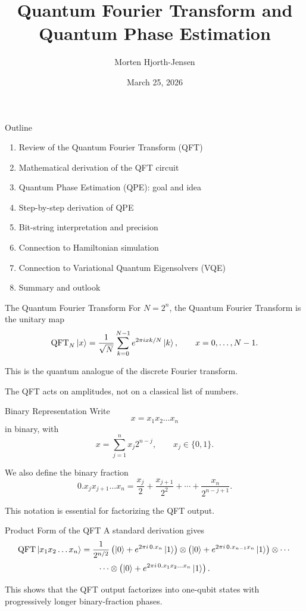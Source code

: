 \documentclass{beamer}
\title{Quantum Fourier Transform and Quantum Phase Estimation}
\author{Morten Hjorth-Jensen}
\date{March 25, 2026}
\begin{document}
\frame{\titlepage}

\begin{frame}{Outline}
\begin{enumerate}
\item Review of the Quantum Fourier Transform (QFT)
\item Mathematical derivation of the QFT circuit
\item Quantum Phase Estimation (QPE): goal and idea
\item Step-by-step derivation of QPE
\item Bit-string interpretation and precision
\item Connection to Hamiltonian simulation
\item Connection to Variational Quantum Eigensolvers (VQE)
\item Summary and outlook
\end{enumerate}
\end{frame}

\begin{frame}{The Quantum Fourier Transform}
For \(N=2^n\), the Quantum Fourier Transform is the unitary map
\[
\mathrm{QFT}_N \ket{x}
=
\frac{1}{\sqrt N}
\sum_{k=0}^{N-1}
e^{2\pi i xk/N}\ket{k},
\qquad x=0,\dots,N-1.
\]

This is the quantum analogue of the discrete Fourier transform.

The QFT acts on amplitudes, not on a classical list of numbers.
\end{frame}

\begin{frame}{Binary Representation}
Write
\[
x = x_1 x_2 \dots x_n
\]
in binary, with
\[
x = \sum_{j=1}^n x_j 2^{n-j},
\qquad x_j\in\{0,1\}.
\]

We also define the binary fraction
\[
0.x_j x_{j+1}\dots x_n
=
\frac{x_j}{2}+\frac{x_{j+1}}{2^2}+\cdots+\frac{x_n}{2^{n-j+1}}.
\]

This notation is essential for factorizing the QFT output.
\end{frame}

\begin{frame}{Product Form of the QFT}
A standard derivation gives
\[
\mathrm{QFT}\ket{x_1x_2\dots x_n}
=
\frac{1}{2^{n/2}}
\left(\ket0+e^{2\pi i\,0.x_n}\ket1\right)
\otimes
\left(\ket0+e^{2\pi i\,0.x_{n-1}x_n}\ket1\right)
\otimes\cdots
\]
\[
\cdots\otimes
\left(\ket0+e^{2\pi i\,0.x_1x_2\dots x_n}\ket1\right).
\]

This shows that the QFT output factorizes into one-qubit states with progressively longer binary-fraction phases.
\end{frame}
\end{document}
